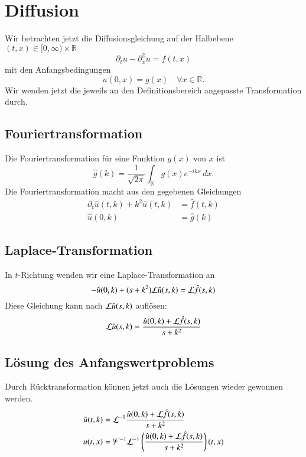 %
%
%
\section{Diffusion}
Wir betrachten jetzt die Diffusionsgleichung auf der Halbebene
$(t,x)\in[0,\infty)\times \mathbb R$
\[
\partial_tu-\partial_x^2u=f(t,x)
\]
mit den Anfangsbedingungen
\[
u(0,x)=g(x)\quad \forall x\in\mathbb R.
\]
Wir wenden jetzt die jeweils an den Definitionsbereich angepasste
Transformation durch.

\subsection{Fouriertransformation}
Die Fouriertransformation für eine Funktion $g(x)$ von $x$ ist
\[
\hat g(k)=\frac1{\sqrt{2\pi}}\int_{\mathbb R}g(x)e^{-ikx}\,dx.
\]
Die Fouriertransformation macht aus den gegebenen Gleichungen
\begin{align*}
\partial_t \hat u(t,k)+k^2\hat u(t,k)&=\hat f(t,k)\\
\hat u(0,k)&=\hat g(k)
\end{align*}

\subsection{Laplace-Transformation}
In $t$-Richtung wenden wir eine Laplace-Transformation an
\[
-\hat u(0,k)+(s+k^2){\cal L}\hat u(s,k)={\cal L}\hat f(s,k)
\]
Diese Gleichung kann nach ${\cal L}\hat u(s,k)$ auflösen:
\[
{\cal L}\hat u(s,k)=\frac{\hat u(0,k)+{\cal L}\hat f(s,k)}{s+k^2}
\]

\subsection{Lösung des Anfangswertproblems}
Durch Rücktransformation können jetzt auch die Lösungen wieder
gewonnen werden.
\begin{align*}
\hat u(t,k)&={\cal L}^{-1}
\frac{\hat u(0,k)+{\cal L}\hat f(s,k)}{s+k^2}
\\
u(t,x)&={\cal F}^{-1}{\cal L}^{-1}
\left(\frac{\hat u(0,k)+{\cal L}\hat f(s,k)}{s+k^2}\right)(t,x)
\end{align*}

